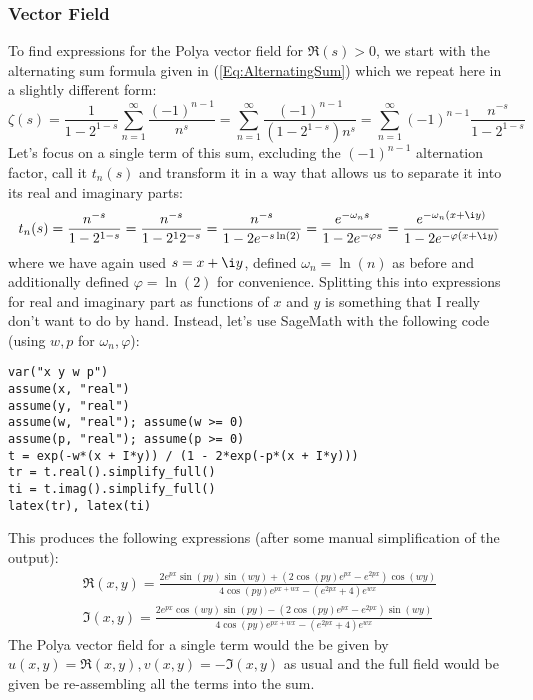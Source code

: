 \documentclass[12pt]{article}
\begin{document}
\subsubsection{Vector Field}
To find expressions for the Polya vector field for $\Re(s) > 0$, we start with the alternating sum formula given in (\ref{Eq:AlternatingSum}) which we repeat here in a slightly different form:
\begin{equation}
\zeta(s) 
= \frac{1}{1 - 2^{1-s}} \sum_{n=1}^{\infty} \frac{(-1)^{n-1}}{n^s}
= \sum_{n=1}^{\infty} \frac{(-1)^{n-1}}{(1 - 2^{1-s}) n^s}
= \sum_{n=1}^{\infty} (-1)^{n-1} \frac{n^{-s}}{1 - 2^{1-s}}
\end{equation}
Let's focus on a single term of this sum, excluding the $(-1)^{n-1}$ alternation factor, call it $t_n(s)$ and transform it in a way that allows us to separate it into its real and imaginary parts:
\begin{equation}
\label{Eq:AlternatingTerm}
t_n(s) 
= \frac{n^{-s}}{1 - 2^{1-s}}
= \frac{n^{-s}}{1 - 2^1 2^{-s}}
= \frac{n^{-s}}{1 - 2  e^{-s \ln(2) }}
= \frac{e^{- \omega_n s}}{1 - 2  e^{- \varphi s}}
= \frac{e^{- \omega_n (x + \i y)}}{1 - 2  e^{- \varphi (x + \i y)}}
\end{equation}
where we have again used $s = x + \i y$, defined $\omega_n = \ln(n)$ as before and additionally defined $\varphi = \ln(2)$ for convenience. Splitting this into expressions for real and imaginary part as functions of $x$ and $y$ is something that I really don't want to do by hand. Instead, let's use SageMath with the following code (using $w,p$ for $\omega_n, \varphi$):
\begin{verbatim}
var("x y w p")
assume(x, "real")
assume(y, "real")
assume(w, "real"); assume(w >= 0)
assume(p, "real"); assume(p >= 0)
t = exp(-w*(x + I*y)) / (1 - 2*exp(-p*(x + I*y)))
tr = t.real().simplify_full()
ti = t.imag().simplify_full()
latex(tr), latex(ti)
\end{verbatim}
This produces the following expressions (after some manual simplification of the output):
\begin{eqnarray}
\Re(x,y)
= \frac{2 e^{p x} \sin(p y) \sin(w y) + (2 \cos(p y) e^{p x} - e^{2 p x}) \cos(w y)}
       {4 \cos(p y) e^{p x + w x} - (e^{2 p x} + 4) e^{w x}} \\
\Im(x,y)
= \frac{2 e^{p x} \cos(w y) \sin(p y) - (2 \cos(p y) e^{p x} - e^{2 p x}) \sin(w y)}
       {4 \cos(p y) e^{p x + w x} - (e^{2 p x} + 4) e^{w x}}
\end{eqnarray}
The Polya vector field for a single term would the be given by $u(x,y) = \Re(x,y), v(x,y) = -\Im(x,y)$ as usual and the full field would be given be re-assembling all the terms into the sum.
\end{document}
